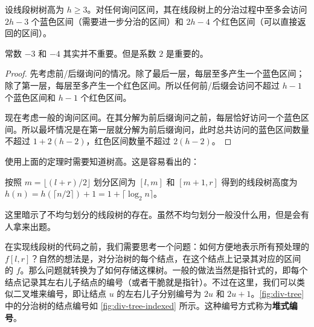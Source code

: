 \begin{theorem}[区间在线段树上的分解]
    设线段树树高为 $h\ge 3$。对任何询问区间，其在线段树上的分治过程中至多会访问 $2h-3$ 个蓝色区间（需要进一步分治的区间）和 $2h-4$ 个红色区间（可以直接返回的区间）。
\end{theorem}
\begin{remark}
    常数 $-3$ 和 $-4$ 其实并不重要。但是系数 $2$ 是重要的。
\end{remark}
\begin{proof}
    先考虑前/后缀询问的情况。除了最后一层，每层至多产生一个蓝色区间；除了第一层，每层至多产生一个红色区间。所以任何前/后缀会访问不超过 $h-1$ 个蓝色区间和 $h-1$ 个红色区间。

    现在考虑一般的询问区间。在其分解为前后缀询问之前，每层恰好访问一个蓝色区间。所以最坏情况是在第一层就分解为前后缀询问，此时总共访问的蓝色区间数量不超过 $1+2(h-2)$，红色区间数量不超过 $2(h-2)$。
\end{proof}

使用上面的定理时需要知道树高。这是容易看出的：
\begin{property}[线段树的树高]
    按照 $m=\lfloor(l+r)/2\rfloor$ 划分区间为 $[l,m]$ 和 $[m+1,r]$ 得到的线段树高度为 $h(n)=h(\lceil n/2\rceil)+1=1+\lceil \log_2 n\rceil$。
\end{property}
\begin{remark}
    这里暗示了不均匀划分的线段树的存在。虽然不均匀划分一般没什么用，但是会有人拿来出题。
\end{remark}

在实现线段树的代码之前，我们需要思考一个问题：如何方便地表示所有预处理的 $f[l,r]$？自然的想法是，对分治树的每个结点，在这个结点上记录其对应的区间的 $f$。那么问题就转换为了如何存储这棵树。一般的做法当然是指针式的，即每个结点记录其左右儿子结点的编号（或者干脆就是指针）。不过在这里，我们可以类似二叉堆来编号，即让结点 $u$ 的左右儿子分别编号为 $2u$ 和 $2u+1$。\cref{fig:div-tree} 中的分治树的结点编号如 \cref{fig:div-tree-indexed} 所示。这种编号方式称为\textbf{堆式编号}。

